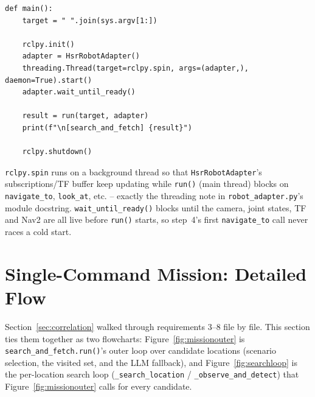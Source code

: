 \documentclass[11pt]{article}
\begin{document}
\begin{lstlisting}[caption={\texttt{search\_and\_fetch\_node.py}: the entire node (lines 18--33)}]
def main():
    target = " ".join(sys.argv[1:])

    rclpy.init()
    adapter = HsrRobotAdapter()
    threading.Thread(target=rclpy.spin, args=(adapter,), daemon=True).start()
    adapter.wait_until_ready()

    result = run(target, adapter)
    print(f"\n[search_and_fetch] {result}")

    rclpy.shutdown()
\end{lstlisting}

\texttt{rclpy.spin} runs on a background thread so that
\texttt{HsrRobotAdapter}'s subscriptions/TF buffer keep updating while
\texttt{run()} (main thread) blocks on \texttt{navigate\_to}, \texttt{look\_at},
etc. -- exactly the threading note in \texttt{robot\_adapter.py}'s module
docstring. \texttt{wait\_until\_ready()} blocks until the camera, joint
states, TF and Nav2 are all live before \texttt{run()} starts, so step~4's
first \texttt{navigate\_to} call never races a cold start.

\section{Single-Command Mission: Detailed Flow}
\label{sec:missionflow}

Section~\ref{sec:correlation} walked through requirements 3--8 file by file.
This section ties them together as two flowcharts: Figure~\ref{fig:missionouter}
is \texttt{search\_and\_fetch.run()}'s outer loop over candidate locations
(scenario selection, the visited set, and the LLM fallback), and
Figure~\ref{fig:searchloop} is the per-location search loop
(\texttt{\_search\_location} / \texttt{\_observe\_and\_detect}) that
Figure~\ref{fig:missionouter} calls for every candidate.
\end{document}

